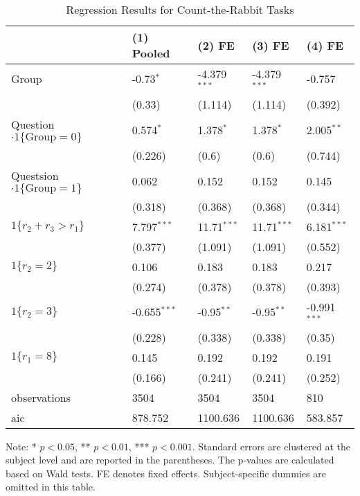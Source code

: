 \documentclass[12pt]{article}
\begin{document}
\begin{table}
    \caption{Regression Results for Count-the-Rabbit Tasks}
    \vspace*{12pt}
    \centering

      \begin{tabular}{lllll}
\hline
 & (1) Pooled & (2) FE & (3) FE & (4) FE \\
\hline
Group & -0.73$^{*}$ & -4.379$^{***}$ & -4.379$^{***}$ & -0.757 \\
 & (0.33) & (1.114) & (1.114) & (0.392) \\
Question$\cdot1\{\text{Group}=0\}$ & 0.574$^{*}$ & 1.378$^{*}$ & 1.378$^{*}$ & 2.005$^{**}$ \\
 & (0.226) & (0.6) & (0.6) & (0.744) \\
Questsion$\cdot1\{\text{Group}=1\}$ & 0.062 & 0.152 & 0.152 & 0.145 \\
 & (0.318) & (0.368) & (0.368) & (0.344) \\
$1\{r_2 + r_3 > r_1\}$ & 7.797$^{***}$ & 11.71$^{***}$ & 11.71$^{***}$ & 6.181$^{***}$ \\
 & (0.377) & (1.091) & (1.091) & (0.552) \\
$1\{r_2 =2\}$ & 0.106 & 0.183 & 0.183 & 0.217 \\
 & (0.274) & (0.378) & (0.378) & (0.393) \\
$1\{r_2=3\}$ & -0.655$^{***}$ & -0.95$^{**}$ & -0.95$^{**}$ & -0.991$^{***}$ \\
 & (0.228) & (0.338) & (0.338) & (0.35) \\
$1\{r_1=8\}$ & 0.145 & 0.192 & 0.192 & 0.191 \\
 & (0.166) & (0.241) & (0.241) & (0.252) \\\hline

observations & 3504 & 3504 & 3504 & 810 \\
aic & 878.752 & 1100.636 & 1100.636 & 583.857 \\
\hline
\end{tabular}

    \vspace*{4pt}
    \centering
    \begin{minipage}{0.85\textwidth}
    {\par\footnotesize Note: * $p<0.05$, ** $p<0.01$, *** $p<0.001$. Standard errors are clustered at the subject level and are reported in the parentheses. The p-values are calculated based on Wald tests. FE denotes fixed effects. Subject-specific dummies are omitted in this table.}
    \end{minipage}
    \label{tab:manipulate_rabbit}
\end{table}
\end{document}
